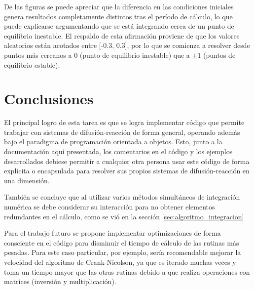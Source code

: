 \documentclass{article}
\begin{document}
De las figuras se puede apreciar que la diferencia en las condiciones iniciales genera resultados completamente distintos tras el período de cálculo, lo que puede explicarse argumentando que se está integrando cerca de un punto de equilibrio inestable. El respaldo de esta afirmación proviene de que los valores aleatorios están acotados entre [-0.3, 0.3], por lo que se comienza a resolver desde puntos más cercanos a $0$ (punto de equilibrio inestable) que a $\pm 1$ (puntos de equilibrio estable).

\section{Conclusiones}

El principal logro de esta tarea es que se logra implementar código que permite trabajar con sistemas de difusión-reacción de forma general, operando además bajo el paradigma de programación orientada a objetos. Esto, junto a la documentación aquí presentada, los comentarios en el código y los ejemplos desarrollados debiese permitir a cualquier otra persona usar este código de forma explícita o encapsulada para resolver sus propios sistemas de difusión-reacción en una dimensión.

También se concluye que al utilizar varios métodos simultáneos de integración numérica se debe considerar su interacción para no obtener elementos redundantes en el cálculo, como se vió en la sección \ref{sec:algoritmo_integracion}

Para el trabajo futuro se propone implementar optimizaciones de forma consciente en el código para disminuir el tiempo de cálculo de las rutinas más pesadas. Para este caso particular, por ejemplo, sería recomendable mejorar la velocidad del algoritmo de Crank-Nicolson, ya que es iterado muchas veces y toma un tiempo mayor que las otras rutinas debido a que realiza operaciones con matrices (inversión y multiplicación).
\end{document}
